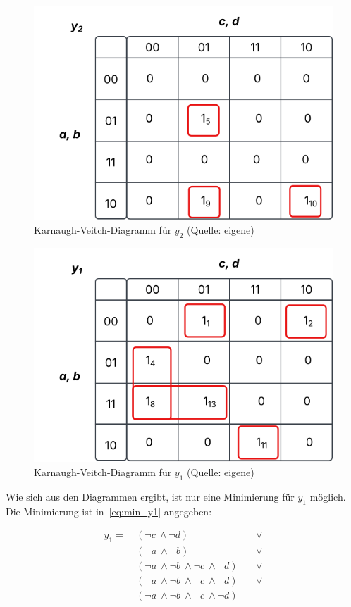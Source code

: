 \begin{figure}
    \centering
    \includegraphics[scale=0.5]{aufgabe 2/img/kv_y2}
    \caption{Karnaugh-Veitch-Diagramm für $y_2$ (Quelle: eigene)}
    \label{fig:kv_y2}
\end{figure}


\begin{figure}
    \centering
    \includegraphics[scale=0.5]{aufgabe 2/img/kv_y1}
    \caption{Karnaugh-Veitch-Diagramm für $y_1$ (Quelle: eigene)}
    \label{fig:kv_y1}
\end{figure}

\noindent
Wie sich aus den Diagrammen ergibt, ist nur eine Minimierung für $y_1$ möglich.
Die Minimierung ist in~\ref{eq:min_y1} angegeben:

\begin{equation}\label{eq:min_y1}
\begin{alignat}{3}
    y_1 =\ &(\neg c \ \land \neg d)\ &&\lor   \\
    &(\phantom{\neg} a \ \land \phantom{\neg} b)\ &&\lor  \\
    &(\neg a \ \land \neg b \ \land \neg c \ \land   \phantom{\neg} d)\ &&\lor  \\
    &(\phantom{\neg} a \ \land \neg b \ \land  \phantom{\neg} c \ \land   \phantom{\neg} d)\ &&\lor  \\
    &(\neg a \ \land \neg b \ \land \phantom{\neg} c \ \land  \neg d)
\end{alignat}
\end{equation}


